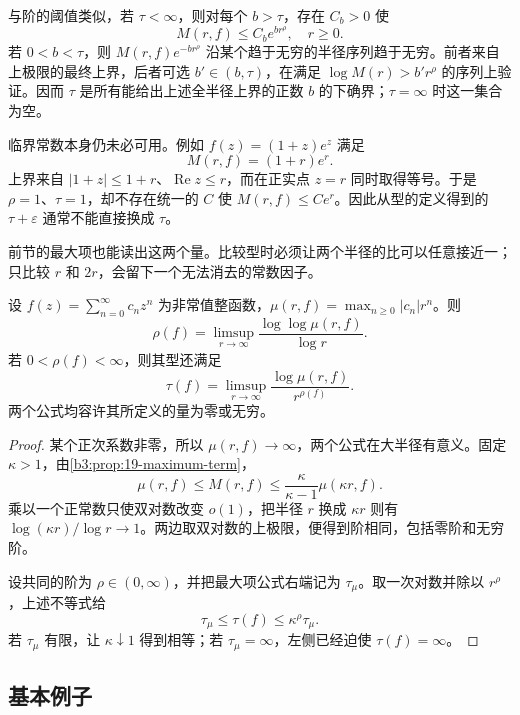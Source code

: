 \ProseParagraphBreak

与阶的阈值类似，若 \(\tau<\infty\)，则对每个 \(b>\tau\)，存在 \(C_b>0\) 使
\[
 M(r,f)\le C_b e^{b r^\rho},\quad r\ge0.
\]
若 \(0<b<\tau\)，则 \(M(r,f)e^{-b r^\rho}\) 沿某个趋于无穷的半径序列趋于无穷。前者来自上极限的最终上界，后者可选 \(b'\in(b,\tau)\)，在满足 \(\log M(r)>b'r^\rho\) 的序列上验证。因而 \(\tau\) 是所有能给出上述全半径上界的正数 \(b\) 的下确界；\(\tau=\infty\) 时这一集合为空。

\ProseParagraphBreak

临界常数本身仍未必可用。例如 \(f(z)=(1+z)e^z\) 满足
\[
 M(r,f)=(1+r)e^r.
\]
上界来自 \(|1+z|\le1+r\)、\(\operatorname{Re}z\le r\)，而在正实点 \(z=r\) 同时取得等号。于是 \(\rho=1\)、\(\tau=1\)，却不存在统一的 \(C\) 使 \(M(r,f)\le C e^r\)。因此从型的定义得到的 \(\tau+\varepsilon\) 通常不能直接换成 \(\tau\)。

\ProseParagraphBreak

前节的最大项也能读出这两个量。比较型时必须让两个半径的比可以任意接近一；只比较 \(r\) 和 \(2r\)，会留下一个无法消去的常数因子。

\begin{proposition}[最大项给出相同的阶与型]\label{b3:prop:19-maximum-term-growth}
设 \(f(z)=\sum_{n=0}^{\infty}c_nz^n\) 为非常值整函数，\(\mu(r,f)=\max_{n\ge0}|c_n|r^n\)。则
\[
 \rho(f)=\limsup_{r\to\infty}
 \frac{\log\log\mu(r,f)}{\log r}.
\]
若 \(0<\rho(f)<\infty\)，则其型还满足
\[
 \tau(f)=\limsup_{r\to\infty}
 \frac{\log\mu(r,f)}{r^{\rho(f)}}.
\]
两个公式均容许其所定义的量为零或无穷。
\end{proposition}
\begin{proof}
某个正次系数非零，所以 \(\mu(r,f)\to\infty\)，两个公式在大半径有意义。固定 \(\kappa>1\)，由\cref{b3:prop:19-maximum-term}，
\[
 \mu(r,f)\le M(r,f)
 \le\frac{\kappa}{\kappa-1}\mu(\kappa r,f).
\]
乘以一个正常数只使双对数改变 \(o(1)\)，把半径 \(r\) 换成 \(\kappa r\) 则有 \(\log(\kappa r)/\log r\to1\)。两边取双对数的上极限，便得到阶相同，包括零阶和无穷阶。

设共同的阶为 \(\rho\in(0,\infty)\)，并把最大项公式右端记为 \(\tau_\mu\)。取一次对数并除以 \(r^\rho\)，上述不等式给
\[
 \tau_\mu\le\tau(f)\le\kappa^\rho\tau_\mu.
\]
若 \(\tau_\mu\) 有限，让 \(\kappa\downarrow1\) 得到相等；若 \(\tau_\mu=\infty\)，左侧已经迫使 \(\tau(f)=\infty\)。
\end{proof}

\subsection{基本例子}
\label{b3:subsec:190203}

